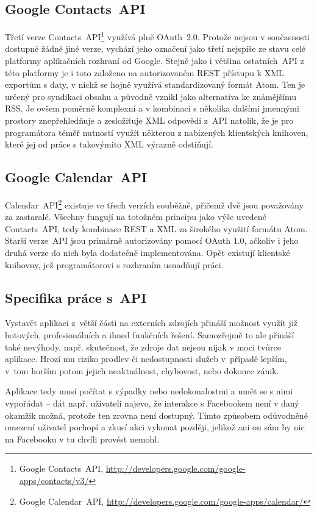 \documentclass[12pt,oneside,final]{fithesis2}
\begin{document}
\subsection{Google Contacts~API}
Třetí verze Contacts~API\footnote{Google Contacts~API, \url{http://developers.google.com/google-apps/contacts/v3/}} využívá plně OAuth~2.0. Protože nejsou v současnosti dostupné žádné jiné verze, vychází jeho označení jako třetí nejspíše ze stavu celé platformy aplikačních rozhraní od Google. Stejně jako i většina ostatních~API z této platformy je i toto založeno na autorizovaném REST přístupu k XML exportům s daty, v nichž se hojně využívá standardizovaný formát Atom. Ten je určený pro syndikaci obsahu a původně vznikl jako alternativa ke známějšímu RSS. Je ovšem poměrně komplexní a v kombinaci s několika dalšími jmennými prostory znepřehledňuje a zesložiťuje XML odpovědi z~API natolik, že je pro programátora téměř nutností využít některou z nabízených klientských knihoven, které jej od práce s takovýmito XML výrazně odstiňují.

\subsection{Google Calendar~API}
Calendar~API\footnote{Google Calendar~API, \url{http://developers.google.com/google-apps/calendar/}} existuje ve třech verzích souběžně, přičemž dvě jsou považovány za zastaralé. Všechny fungují na totožném principu jako výše uvedené Contacts~API, tedy kombinace REST a XML za širokého využití formátu Atom. Starší verze~API jsou primárně autorizovány pomocí OAuth 1.0, ačkoliv i jeho druhá verze do nich byla dodatečně implementována. Opět existují klientské knihovny, jež programátorovi s rozhraním usnadňují práci.

\subsection{Specifika práce s~API}
Vystavět aplikaci z~větší části na externích zdrojích přináší možnost využít již hotových, profesionálních a ihned funkčních řešení. Samozřejmě to ale přináší také nevýhody, např. skutečnost, že zdroje dat nejsou nijak v moci tvůrce aplikace. Hrozí mu riziko prodlev či nedostupnosti služeb v~případě lepším, v~tom horším potom jejich neaktuálnost, chybovost, nebo dokonce zánik.

Aplikace tedy musí počítat s výpadky nebo nedokonalostmi a umět se s nimi vypořádat -- dát např. uživateli najevo, že interakce s Facebookem není v daný okamžik možná, protože ten zrovna není dostupný. Tímto způsobem odůvodněné omezení uživatel pochopí a zkusí akci vykonat později, jelikož ani on sám by nic na Facebooku v tu chvíli provést nemohl.
\end{document}

